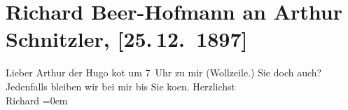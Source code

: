 

         
         \renewcommand{\erwaehntePersonen}{Personen: Hugo von Hofmannsthal}
         \renewcommand{\erwaehnteOrte}{Orte: Wien, Wollzeile}
         \renewcommand{\erwaehnteWerke}{}
               \section[Richard Beer-Hofmann an Arthur Schnitzler, {[}25. 12. 1897{]}]{ Richard Beer-Hofmann an Arthur Schnitzler, {[}25. 12. 1897{]}}\nopagebreak{}\rehead{ }\begin{ledgroupsized}[t]{13cm}\normalsize\beginnumbering \toendnotes[C]{\smallbreak\pagebreak[2]} 
\pstart
           \noindent{}{\pb}Lieber Arthur der
                  Hugo ko{\geminationm}t um
                  7 Uhr zu mir (Wollzeile.)
               Sie doch auch?\pend
           \pstart
           Jedenfalls bleiben wir bei mir bis Sie ko{\geminationm}en.\pend
           \pstart
           Herzlichst{\\[\baselineskip]}\spacefill\mbox{Richard}\pend
           \leftskip=0em{}
         
         \endnumbering{}\end{ledgroupsized}  \newcommand{\dateiname}{L00751}\newcommand{\titel}{Richard Beer-Hofmann an Arthur Schnitzler, [25. 12. 1897]}\newcommand{\editorInnen}{Martin Anton Müller und Gerd-Hermann Susen}
      